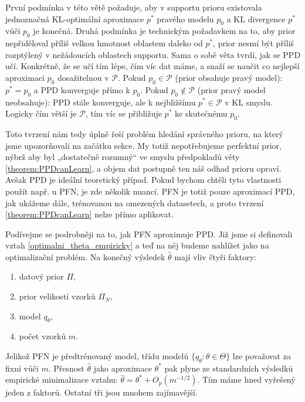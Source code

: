 První podmínka v této větě požaduje, aby v supportu prioru existovala jednoznačná KL-optimální aproximace $p^*$ pravého modelu $p_0$ a KL divergence $p^*$ vůči $p_0$ je konečná.
Druhá podmínka je technickým požadavkem na to, aby prior nepřiděloval příliš velkou hmotnost oblastem daleko od $p^*$, prior nesmí být příliš rozptýlený v nežádoucích oblastech supportu.
Sama o sobě věta tvrdí, jak se PPD učí.
Konkrétně, že se učí tím lépe, čím víc dat máme, a snaží se naučit co nejlepší aproximaci $p_0$ dosažitelnou v $\mathcal{P}$.
Pokud $p_0 \in \mathcal{P}$ (prior obsahuje pravý model): $p^* = p_0$ a PPD konverguje přímo k $p_0$.
Pokud $p_0 \notin \mathcal{P}$ (prior pravý model neobsahuje): PPD stále konverguje, ale k nejbližšímu $p^* \in \mathcal{P}$ v KL smyslu.
Logicky čím větší je $\mathcal{P}$, tím víc se přibližuje $p^*$ ke skutečnému $p_0$.
\par   

Toto tvrzení nám tedy úplně řeší problém hledání správného prioru, na který jsme upozorňovali na začátku sekce.
My totiž nepotřebujeme perfektní prior, nýbrž aby byl „dostatečně rozumný“ ve smyslu předpokladů věty \ref{theorem:PPDcanLearn}, a objem dat postupně ten náš odhad prioru opraví.
Avšak PPD je ideální teoretický případ.
Pokud bychom chtěli tyto vlastnosti použít např. u PFN, je zde několik nuancí. 
PFN je totiž pouze aproximací PPD, jak ukážeme dále, trénovanou na omezených datasetech, a proto tvrzení \ref{theorem:PPDcanLearn} nelze přímo aplikovat. 
\par   

Podívejme se podrobněji na to, jak PFN aproximuje PPD.
Již jsme si definovali vztah \ref{optimalni_theta_empiricky} a teď na něj budeme nahlížet jako na optimalizační problém.
Na konečný výsledek $\hat{\theta}$ mají vliv čtyři faktory:
\begin{enumerate}
    \item datový prior $\Pi$,
    \item prior velikostí vzorků $\Pi_N$,
    \item model $q_{\theta}$,
    \item počet vzorků $m$.
\end{enumerate}

Jelikož PFN je předtrénovaný model, třídu modelů $\{q_\theta : \theta \in \Theta\}$ lze považovat za fixní vůči $m$.
Přesnost $\hat{\theta}$ jako aproximace $\theta^*$ pak plyne ze standardních výsledků empirické minimalizace vztahu: $\hat{\theta} = \theta^* + O_p(m^{-1/2})$.
Tím máme hned vyřešený jeden z faktorů.
Ostatní tři jsou mnohem zajímavější.
\par   

